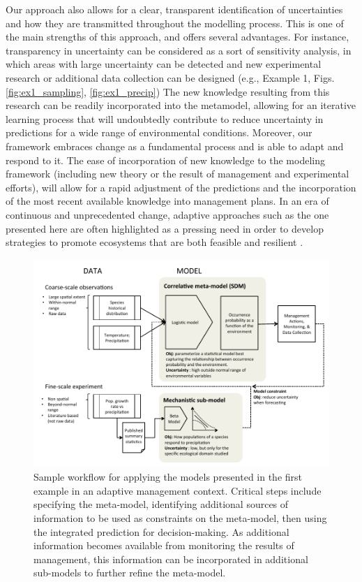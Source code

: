 Our approach also allows for a clear, transparent identification of uncertainties and how they are transmitted throughout the modelling process. 
This is one of the main strengths of this approach, and offers several advantages. 
For instance, transparency in uncertainty can be considered as a sort of sensitivity analysis, in which areas with large uncertainty can be detected and new experimental research or additional data collection can be designed (e.g., Example 1, Figs. \ref{fig:ex1_sampling}, \ref{fig:ex1_precip})
The new knowledge resulting from this research can be readily incorporated into the metamodel, allowing for an iterative learning process that will undoubtedly contribute to reduce uncertainty in predictions for a wide range of environmental conditions. 
Moreover, our framework embraces change as a fundamental process and is able to adapt and respond to it. 
The ease of incorporation of new knowledge to the modeling framework (including new theory or the result of management and experimental efforts), will allow for a rapid adjustment of the predictions and the incorporation of the most recent available knowledge into management plans. 
In an era of continuous and unprecedented change, adaptive approaches such as the one presented here are often highlighted as a pressing need in order to develop strategies to promote ecosystems that are both feasible and resilient \citep[][Fig. \ref{fig:adaptive_management}]{Seastedt2008, Mori2013}.


\begin{figure}[tb]
	\includegraphics{adaptive_management.pdf}
	\caption{Sample workflow for applying the models presented in the first example in an adaptive management context.
	Critical steps include specifying the meta-model, identifying additional sources of information to be used as constraints on the meta-model, then using the integrated prediction for decision-making.
	As additional information becomes available from monitoring the results of management, this information can be incorporated in additional sub-models to further refine the meta-model.}
	\label{fig:adaptive_management}
\end{figure}

